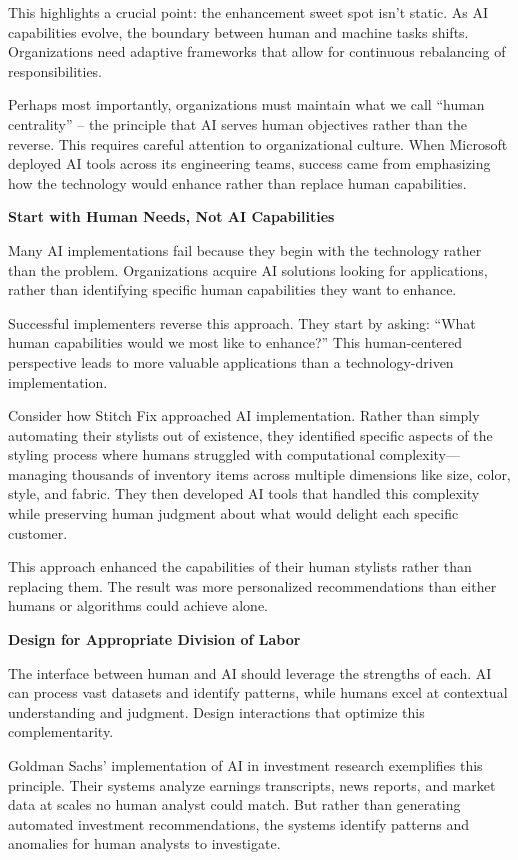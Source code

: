 \documentclass[
  Letterpaper,
]{scrbook}
\begin{document}
This highlights a crucial point: the enhancement sweet spot isn't
static. As AI capabilities evolve, the boundary between human and
machine tasks shifts. Organizations need adaptive frameworks that allow
for continuous rebalancing of responsibilities.

Perhaps most importantly, organizations must maintain what we call
``human centrality'' -- the principle that AI serves human objectives
rather than the reverse. This requires careful attention to
organizational culture. When Microsoft deployed AI tools across its
engineering teams, success came from emphasizing how the technology
would enhance rather than replace human capabilities.

\textbf{Start with Human Needs, Not AI Capabilities}

Many AI implementations fail because they begin with the technology
rather than the problem. Organizations acquire AI solutions looking for
applications, rather than identifying specific human capabilities they
want to enhance.

Successful implementers reverse this approach. They start by asking:
``What human capabilities would we most like to enhance?'' This
human-centered perspective leads to more valuable applications than a
technology-driven implementation.

Consider how Stitch Fix approached AI implementation. Rather than simply
automating their stylists out of existence, they identified specific
aspects of the styling process where humans struggled with computational
complexity---managing thousands of inventory items across multiple
dimensions like size, color, style, and fabric. They then developed AI
tools that handled this complexity while preserving human judgment about
what would delight each specific customer.

This approach enhanced the capabilities of their human stylists rather
than replacing them. The result was more personalized recommendations
than either humans or algorithms could achieve alone.

\textbf{Design for Appropriate Division of Labor}

The interface between human and AI should leverage the strengths of
each. AI can process vast datasets and identify patterns, while humans
excel at contextual understanding and judgment. Design interactions that
optimize this complementarity.

Goldman Sachs' implementation of AI in investment research exemplifies
this principle. Their systems analyze earnings transcripts, news
reports, and market data at scales no human analyst could match. But
rather than generating automated investment recommendations, the systems
identify patterns and anomalies for human analysts to investigate.
\end{document}
